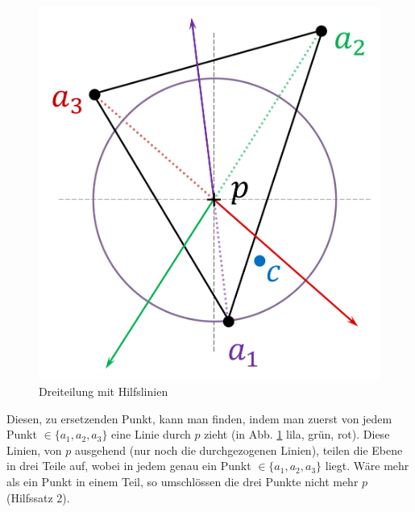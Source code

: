 \documentclass[a4paper]{extarticle}
\begin{document}
    \begin{figure}[!ht]
        \centering	
        \includegraphics[scale=0.15]{bilder/tri_2.pdf}
        \caption{Dreiteilung mit Hilfslinien}
        \label{fig:triangulation_2}
    \end{figure}

    Diesen, zu ersetzenden Punkt, kann man finden, indem man zuerst von jedem Punkt 
    $\in \{ a_1, a_2, a_3 \}$ eine Linie durch $p$ zieht (in Abb. \ref{fig:triangulation_2} lila, 
    grün, rot). Diese Linien, von $p$ ausgehend (nur noch die durchgezogenen Linien), teilen die 
    Ebene in drei Teile auf, wobei in jedem genau ein Punkt $\in \{ a_1, a_2, a_3 \}$ liegt.
    Wäre mehr als ein Punkt in einem Teil, so umschlössen die drei Punkte nicht mehr $p$ 
    (Hilfssatz 2).
\end{document}
